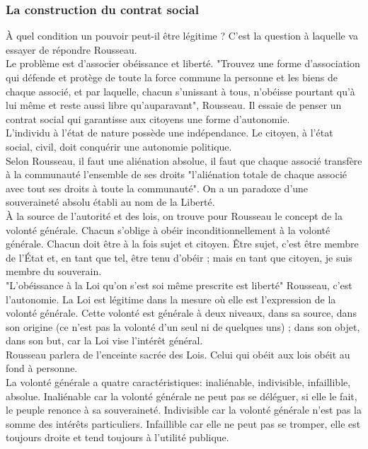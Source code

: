 \documentclass[10pt, a4paper, openany]{book}
\begin{document}
\subsubsection{La construction du contrat social}

À quel condition un pouvoir peut-il être légitime ? C'est la question à laquelle va essayer de répondre Rousseau. \\
Le problème est d'associer obéissance et liberté. "Trouvez une forme d'association qui défende et protège de toute la force commune la personne et les biens de chaque associé, et par laquelle, chacun s'unissant à tous, n'obéisse pourtant qu'à lui même et reste aussi libre qu'auparavant", Rousseau. Il essaie de penser un contrat social qui garantisse aux citoyens une forme d'autonomie. \\
L'individu à l'état de nature possède une indépendance. Le citoyen, à l'état social, civil, doit conquérir une autonomie politique. \\
Selon Rousseau, il faut une aliénation absolue, il faut que chaque associé transfère à la communauté l'ensemble de ses droits "l'aliénation totale de chaque associé avec tout ses droits à toute la communauté". On a un paradoxe d'une souveraineté absolu établi au nom de la Liberté. \\
À la source de l'autorité et des lois, on trouve pour Rousseau le concept de la volonté générale. Chacun s'oblige à obéir inconditionnellement à la volonté générale. Chacun doit être à la fois sujet et citoyen. Être sujet, c'est être membre de l'État et, en tant que tel, être tenu d'obéir ; mais en tant que citoyen, je suis membre du souverain. \\
"L'obéissance à la Loi qu'on s'est soi même prescrite est liberté" Rousseau, c'est l'autonomie. La Loi est légitime dans la mesure où elle est l'expression de la volonté générale. Cette volonté est générale à deux niveaux, dans sa source, dans son origine (ce n'est pas la volonté d'un seul ni de quelques uns) ; dans son objet, dans son but, car la Loi vise l'intérêt général. \\
Rousseau parlera de l'enceinte sacrée des Lois. Celui qui obéit aux lois obéit au fond à personne. \\
La volonté générale a quatre caractéristiques: inaliénable, indivisible, infaillible, absolue. Inaliénable car la volonté générale ne peut pas se déléguer, si elle le fait, le peuple renonce à sa souveraineté. Indivisible car la volonté générale n'est pas la somme des intérêts particuliers. Infaillible car elle ne peut pas se tromper, elle est toujours droite et tend toujours à l'utilité publique.  
\end{document}
